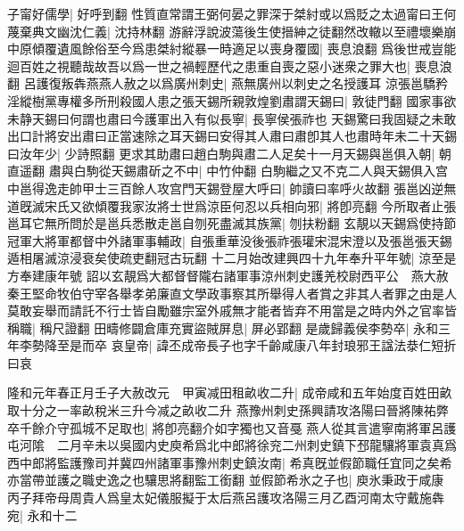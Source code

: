 子甯好儒學|{
	好呼到翻}
性質直常謂王弼何晏之罪深于桀紂或以爲貶之太過甯曰王何蔑棄典文幽沈仁義|{
	沈持林翻}
游辭浮說波蕩後生使搢紳之徒翻然改轍以至禮壞樂崩中原傾覆遺風餘俗至今爲患桀紂縱暴一時適足以喪身覆國|{
	喪息浪翻}
爲後世戒豈能迴百姓之視聽哉故吾以爲一世之禍輕歷代之患重自喪之惡小迷衆之罪大也|{
	喪息浪翻}
呂護復叛犇燕燕人赦之以爲廣州刺史|{
	燕無廣州以刺史之名授護耳}
涼張邕驕矜淫縱樹黨專權多所刑殺國人患之張天錫所親敦煌劉肅謂天錫曰|{
	敦徒門翻}
國家事欲未静天錫曰何謂也肅曰今護軍出入有似長寧|{
	長寧侯張祚也}
天錫驚曰我固疑之未敢出口計將安出肅曰正當速除之耳天錫曰安得其人肅曰肅卽其人也肅時年未二十天錫曰汝年少|{
	少詩照翻}
更求其助肅曰趙白駒與肅二人足矣十一月天錫與邕俱入朝|{
	朝直遥翻}
肅與白駒從天錫肅斫之不中|{
	中竹仲翻}
白駒繼之又不克二人與天錫俱入宫中邕得逸走帥甲士三百餘人攻宫門天錫登屋大呼曰|{
	帥讀曰率呼火故翻}
張邕凶逆無道旣滅宋氏又欲傾覆我家汝將士世爲涼臣何忍以兵相向邪|{
	將卽亮翻}
今所取者止張邕耳它無所問於是邕兵悉散走邕自刎死盡滅其族黨|{
	刎扶粉翻}
玄靚以天錫爲使持節冠軍大將軍都督中外諸軍事輔政|{
	自張重華没後張祚張瓘宋混宋澄以及張邕張天錫遁相屠滅涼浸衰矣使疏吏翻冠古玩翻}
十二月始改建興四十九年奉升平年號|{
	涼至是方奉建康年號}
詔以玄靚爲大都督督隴右諸軍事涼州刺史護羌校尉西平公　燕大赦秦王堅命牧伯守宰各舉孝弟廉直文學政事察其所舉得人者賞之非其人者罪之由是人莫敢妄舉而請託不行士皆自勵雖宗室外戚無才能者皆弃不用當是之時内外之官率皆稱職|{
	稱尺證翻}
田疇修闢倉庫充實盜賊屏息|{
	屏必郢翻}
是歲歸義侯李勢卒|{
	永和三年李勢降至是而卒}
哀皇帝|{
	諱丕成帝長子也字千齡咸康八年封琅邪王諡法㳟仁短折曰哀}


隆和元年春正月壬子大赦改元　甲寅减田租畝收二升|{
	成帝咸和五年始度百姓田畝取十分之一率畝稅米三升今减之畝收二升}
燕豫州刺史孫興請攻洛陽曰晉將陳祐弊卒千餘介守孤城不足取也|{
	將卽亮翻介如字獨也又音戞}
燕人從其言遣寧南將軍呂護屯河隂　二月辛未以吳國内史庾希爲北中郎將徐兖二州刺史鎮下邳龍驤將軍袁真爲西中郎將監護豫司并冀四州諸軍事豫州刺史鎮汝南|{
	希真旣並假節職任宜同之矣希亦當帶並護之職史逸之也驤思將翻監工銜翻}
並假節希氷之子也|{
	庾氷秉政于咸康}
丙子拜帝母周貴人爲皇太妃儀服擬于太后燕呂護攻洛陽三月乙酉河南太守戴施犇宛|{
	永和十二}


